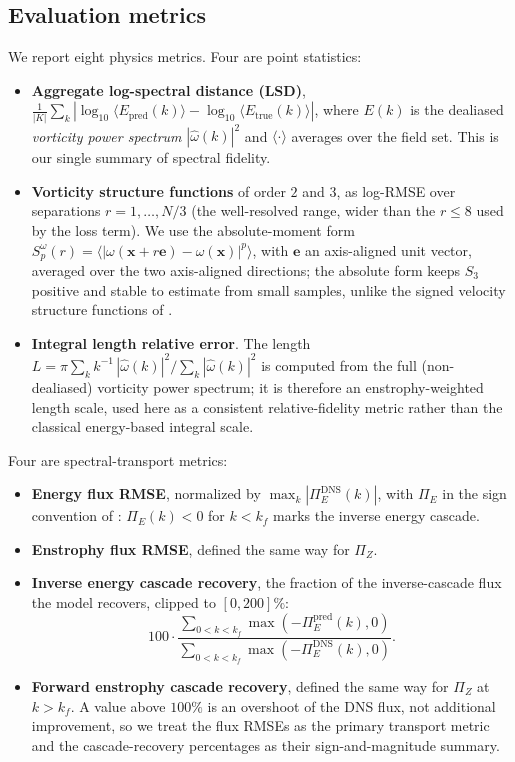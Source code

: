 \documentclass[10pt]{article} %
\begin{document}
\subsection{Evaluation metrics}
\label{sec:metrics}

We report eight physics metrics. Four are point statistics:
\begin{itemize}
\item \textbf{Aggregate log-spectral distance (LSD)}, $\frac{1}{|K|}\sum_k |\log_{10} \langle E_{\text{pred}}(k) \rangle - \log_{10} \langle E_{\text{true}}(k) \rangle|$, where $E(k)$ is the dealiased \emph{vorticity power spectrum} $|\hat{\omega}(k)|^2$ and $\langle\cdot\rangle$ averages over the field set. This is our single summary of spectral fidelity.
\item \textbf{Vorticity structure functions} of order $2$ and $3$, as log-RMSE over separations $r = 1, \dots, N/3$ (the well-resolved range, wider than the $r \le 8$ used by the loss term). We use the absolute-moment form $S_p^\omega(r) = \langle |\omega(\mathbf{x} + r\mathbf{e}) - \omega(\mathbf{x})|^p \rangle$, with $\mathbf{e}$ an axis-aligned unit vector, averaged over the two axis-aligned directions; the absolute form keeps $S_3$ positive and stable to estimate from small samples, unlike the signed velocity structure functions of \citet{frisch1995turbulence}.
\item \textbf{Integral length relative error}. The length $L = \pi \sum_k k^{-1}\,|\hat{\omega}(k)|^2 \big/ \sum_k |\hat{\omega}(k)|^2$ is computed from the full (non-dealiased) vorticity power spectrum; it is therefore an enstrophy-weighted length scale, used here as a consistent relative-fidelity metric rather than the classical energy-based integral scale.
\end{itemize}
Four are spectral-transport metrics:
\begin{itemize}
\item \textbf{Energy flux RMSE}, normalized by $\max_k |\Pi_E^{\text{DNS}}(k)|$, with $\Pi_E$ in the sign convention of \citet{boffetta2012two}: $\Pi_E(k) < 0$ for $k < k_f$ marks the inverse energy cascade.
\item \textbf{Enstrophy flux RMSE}, defined the same way for $\Pi_Z$.
\item \textbf{Inverse energy cascade recovery}, the fraction of the inverse-cascade flux the model recovers, clipped to $[0, 200]\%$:
\[
100 \cdot \frac{\sum_{0 < k < k_f} \max(-\Pi_E^{\text{pred}}(k), 0)}{\sum_{0 < k < k_f} \max(-\Pi_E^{\text{DNS}}(k), 0)}.
\]
\item \textbf{Forward enstrophy cascade recovery}, defined the same way for $\Pi_Z$ at $k > k_f$. A value above $100\%$ is an overshoot of the DNS flux, not additional improvement, so we treat the flux RMSEs as the primary transport metric and the cascade-recovery percentages as their sign-and-magnitude summary.
\end{itemize}
\end{document}
